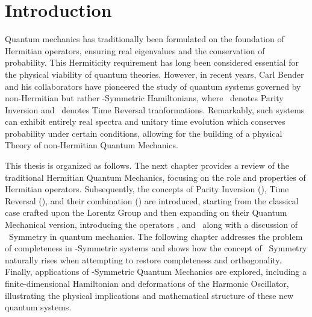 \chapter{Introduction}\label{ch:introduction}
    Quantum mechanics has traditionally been formulated on the foundation of Hermitian operators, ensuring real eigenvalues and the conservation of probability. This Hermiticity requirement has long been considered essential for the physical viability of quantum theories. However, in recent years, Carl Bender and his collaborators have pioneered the study of quantum systems governed by non-Hermitian but rather \PT-Symmetric Hamiltonians, where \mcP\ denotes Parity Inversion and \mcT\ denotes Time Reversal tranformations. Remarkably, such systems can exhibit entirely real spectra and unitary time evolution which conserves probability under certain conditions, allowing for the building of a physical Theory of non-Hermitian Quantum Mechanics.

    This thesis is organized as follows. The next chapter provides a review of the traditional Hermitian Quantum Mechanics, focusing on the role and properties of Hermitian operators. Subsequently, the concepts of Parity Inversion (\mcP), Time Reversal (\mcT), and their combination (\PT) are introduced, starting from the classical case crafted upon the Lorentz Group and then expanding on their Quantum Mechanical version, introducing the operators \hP, \hT and \hPT\ along with a discussion of \PT\ Symmetry in quantum mechanics. The following chapter addresses the problem of completeness in \PT-Symmetric systems and shows how the concept of \CPT\ Symmetry naturally rises when attempting to restore completeness and orthogonality. Finally, applications of \PT-Symmetric Quantum Mechanics are explored, including a finite-dimensional Hamiltonian and deformations of the Harmonic Oscillator, illustrating the physical implications and mathematical structure of these new quantum systems.